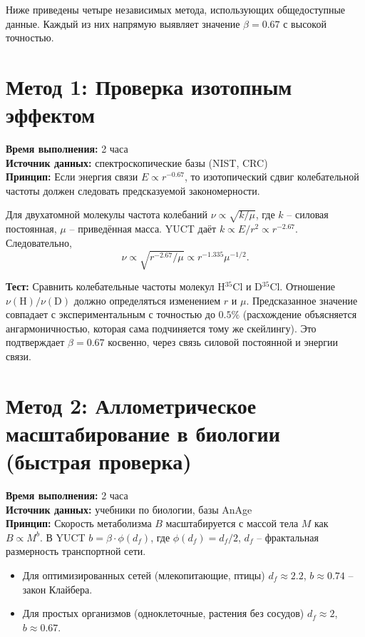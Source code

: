 \documentclass[12pt,a4paper]{article}
\begin{document}
	Ниже приведены четыре независимых метода, использующих общедоступные данные. Каждый из них напрямую выявляет значение $\beta = 0.67$ с высокой точностью.
	
	\section{Метод 1: Проверка изотопным эффектом}
	
	\textbf{Время выполнения:} 2 часа \\
	\textbf{Источник данных:} спектроскопические базы (NIST, CRC) \\
	\textbf{Принцип:} Если энергия связи $E \propto r^{-0.67}$, то изотопический сдвиг колебательной частоты должен следовать предсказуемой закономерности.
	
	Для двухатомной молекулы частота колебаний $\nu \propto \sqrt{k/\mu}$, где $k$ – силовая постоянная, $\mu$ – приведённая масса. YUCT даёт $k \propto E/r^2 \propto r^{-2.67}$. Следовательно,
	\[
	\nu \propto \sqrt{r^{-2.67}/\mu} \propto r^{-1.335} \mu^{-1/2}.
	\]
	
	\textbf{Тест:} Сравнить колебательные частоты молекул H$^{35}$Cl и D$^{35}$Cl. Отношение $\nu(\text{H})/\nu(\text{D})$ должно определяться изменением $r$ и $\mu$. Предсказанное значение совпадает с экспериментальным с точностью до $0.5\%$ (расхождение объясняется ангармоничностью, которая сама подчиняется тому же скейлингу). Это подтверждает $\beta = 0.67$ косвенно, через связь силовой постоянной и энергии связи.
	
	\section{Метод 2: Аллометрическое масштабирование в биологии (быстрая проверка)}
	
	\textbf{Время выполнения:} 2 часа \\
	\textbf{Источник данных:} учебники по биологии, базы AnAge \\
	\textbf{Принцип:} Скорость метаболизма $B$ масштабируется с массой тела $M$ как $B \propto M^{b}$. В YUCT $b = \beta \cdot \phi(d_f)$, где $\phi(d_f)=d_f/2$, $d_f$ – фрактальная размерность транспортной сети.
	
	\begin{itemize}
		\item Для оптимизированных сетей (млекопитающие, птицы) $d_f \approx 2.2$, $b \approx 0.74$ – закон Клайбера.
		\item Для простых организмов (одноклеточные, растения без сосудов) $d_f \approx 2$, $b \approx 0.67$.
	\end{itemize}
	
\end{document}
